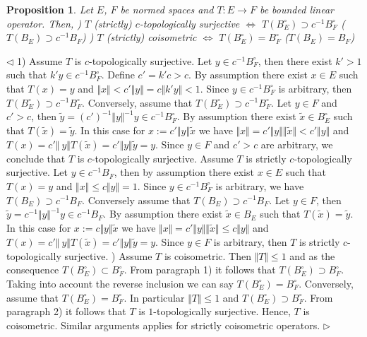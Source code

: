 \documentclass[12pt]{article}
\newtheorem{proposition}[theorem]{Proposition}
\newenvironment{proof}{\par $\triangleleft$}{$\triangleright$}
\begin{document}
\begin{proposition}\label{PrEquivDescOfIsomCoisomOp}
Let $E$, $F$ be normed spaces and $T:E\to F$ be bounded linear operator. Then,
) $T$ (strictly) $c$-topologically surjective $\Longleftrightarrow$ $T(B_E^\circ)\supset c^{-1}B_F^\circ$ ($T(B_E)\supset c^{-1}B_F$) 
) $T$ (strictly) coisometric $\Longleftrightarrow$ $T(B_E^\circ)=B_F^\circ$ ($T(B_E)=B_F$)
\end{proposition}
\begin{proof}
1) Assume $T$ is $c$-topologically surjective. Let $y\in c^{-1}B_F^\circ$, then there exist $k'>1$ such that $k'y\in c^{-1}B_F^\circ$. Define $c'=k'c>c$. By assumption there exist $x\in E$ such that $T(x)=y$ and 
$\Vert x\Vert< c'\Vert y\Vert=c\Vert k'y\Vert<1$. Since $y\in c^{-1}B_F^\circ$ is arbitrary, then $T(B_E^\circ)\supset c^{-1}B_F^\circ$. Conversely, assume that $T(B_E^\circ)\supset c^{-1}B_F^\circ$. Let $y\in F$ and $c'>c$, then 
$\tilde{y}=(c')^{-1}\Vert y\Vert^{-1}y\in c^{-1}B_F^\circ$. By assumption there exist $\tilde{x}\in B_E^\circ$ such that $T(\tilde{x})=\tilde{y}$. In this case for $x:=c'\Vert y\Vert\tilde{x}$ we have 
$\Vert x \Vert=c'\Vert y\Vert\Vert\tilde{x}\Vert< c'\Vert y\Vert$ and $T(x)=c'\Vert\ y\Vert T(\tilde{x})=c'\Vert y\Vert\tilde{y}=y$. Since $y\in F$ and $c'>c$ are arbitrary, we conclude that $T$ is $c$-topologically surjective.
\newline
Assume $T$ is strictly $c$-topologically surjective. Let $y\in c^{-1}B_F$, then by assumption there exist $x\in E$ such that $T(x)=y$ and $\Vert x\Vert\leq c\Vert 
y\Vert=1$. Since $y\in c^{-1}B_F^\circ$ is arbitrary, we have $T(B_E)\supset c^{-1}B_F$. 
Conversely assume that $T(B_E)\supset c^{-1}B_F$. Let $y\in F$, then 
$\tilde{y}=c^{-1}\Vert y\Vert^{-1}y\in c^{-1}B_F$. By assumption there exist 
$\tilde{x}\in B_E$ such that $T(\tilde{x})=\tilde{y}$. In this case for 
$x:=c\Vert y\Vert\tilde{x}$ we have $\Vert x \Vert=c'\Vert 
y\Vert\Vert\tilde{x}\Vert\leq c\Vert y\Vert$ and $T(x)=c'\Vert\ y\Vert 
T(\tilde{x})=c'\Vert y\Vert\tilde{y}=y$. Since $y\in F$ is arbitrary, then $T$ is strictly $c$-topologically surjective.
) Assume $T$ is coisometric. Then $\Vert T\Vert\leq 1$ and as the consequence $T(B_E^\circ)\subset B_F^\circ$. From paragraph 1) it follows that $T(B_E^\circ)\supset B_F^\circ$. Taking into account the reverse inclusion we can say $T(B_E^\circ)=B_F^\circ$. Conversely, assume that $T(B_E^\circ)=B_F^\circ$. In particular $\Vert T\Vert\leq 1$ and $T(B_E^\circ)\supset B_F^\circ$. From paragraph 2) it follows that $T$ is $1$-topologically surjective. 
Hence, $T$ is coisometric. Similar arguments applies for strictly coisometric operators.
\end{proof}
\end{document}

